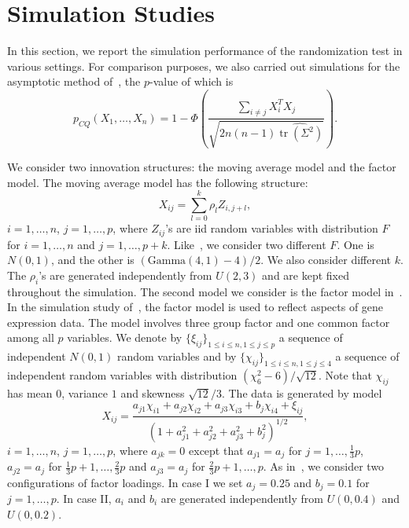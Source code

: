 \documentclass[smallcondensed,final,natbib]{svjour3}          %
\DeclareMathOperator{\mytr}{tr}
\begin{document}
\section{Simulation Studies}

In this section, we report the simulation performance of the randomization test in various settings.
For comparison purposes, we also carried out simulations for the asymptotic method of~\citet{Chen2010A},
the $p$-value of which is
\begin{equation*}
p_{CQ}(X_1,\ldots,X_n)=1-\Phi\left(\frac{\sum_{i\neq j}X_i^T X_j}{\sqrt{2n(n-1)\widehat{\mytr(\Sigma^2)}}}\right).
\end{equation*}

We consider two innovation structures: the moving average model and the factor model.
The moving average model has the following structure:
    \begin{equation*}
    X_{ij}=\sum_{l=0}^k \rho_{l}Z_{i,j+l},
    \end{equation*}
$i=1,\ldots, n$, $j=1,\ldots, p$, where $Z_{ij}$'s are iid random variables with distribution $F$ for $i=1,\ldots, n$ and $j=1,\ldots, p+k$. 
Like~\citet{Chen2010A}, we consider two different $F$.
One is $N(0,1)$, and the other is $(\textrm{Gamma}(4,1)-4)/2$.
We also consider different $k$.
The $\rho_i$'s are generated independently from $U(2,3)$ and are kept fixed throughout the simulation.
The second model we consider is the factor model in~\citet{fan2007to}.
In the simulation study of~\citet{fan2007to}, the factor model is used to reflect aspects of gene expression data.
The model involves three group factor and one common factor among all $p$ variables. 
We denote by $\{\xi_{ij}\}_{1\leq i\leq n, 1\leq j\leq p}$ a sequence of independent $N(0,1)$ random variables and by $\{\chi_{ij}\}_{1\leq i \leq n, 1\leq j \leq 4}$ a sequence of independent random variables with distribution $(\chi_{6}^2-6)/\sqrt{12}$.
Note that $\chi_{ij}$ has mean $0$, variance $1$ and skewness $\sqrt{12}/3$.
The data is generated by model
\begin{equation*}
    X_{ij}=\frac{a_{j1}\chi_{i1}+a_{j2}\chi_{i2}+a_{j3}\chi_{i3}+b_{j}\chi_{i4}+\xi_{ij}}{{(1+a_{j1}^2+a_{j2}^2+a_{j3}^2+b_j^2)}^{1/2}},
\end{equation*}
$i=1,\ldots, n$, $j=1,\ldots, p$,
where $a_{jk}=0$ except that $a_{j1}=a_j$ for $j=1,\ldots,\frac{1}{3}p$, $a_{j2}=a_j$ for $\frac{1}{3}p+1,\ldots,\frac{2}{3}p$ and $a_{j3}=a_j$ for $\frac{2}{3}p+1,\ldots,p$.
As in~\citet{fan2007to}, we consider two configurations of factor loadings. In  case I we set $a_j=0.25$ and $b_j=0.1$ for $j=1,\ldots, p$. In case II, $a_i$ and $b_i$ are generated independently from $U(0,0.4)$ and $U(0,0.2)$.
\end{document}

